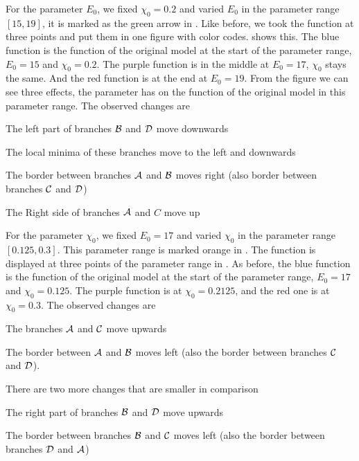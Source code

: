 For the parameter $E_0$, we fixed $\chi_0 = 0.2$ and varied $E_0$ in the parameter range $[15, 19]$, it is marked as the green arrow in .
Like before, we took the function at three points and put them in one figure with color codes.
 shows this.
The blue function is the function of the original model at the start of the parameter range, $E_0 = 15$ and $\chi_0 = 0.2$.
The purple function is in the middle at $E_0 = 17$, $\chi_0$ stays the same.
And the red function is at the end at $E_0 = 19$.
From the figure we can see three effects, the parameter has on the function of the original model in this parameter range.
The observed changes are
\begin{enumerate*}
    \item The left part of branches $\mathcal{B}$ and $\mathcal{D}$ move downwards
    \item The local minima of these branches move to the left and downwards
    \item The border between branches $\mathcal{A}$ and $\mathcal{B}$ moves right (also border between branches $\mathcal{C}$ and $\mathcal{D}$)
    \item The Right side of branches $\mathcal{A}$ and $C$ move up 
\end{enumerate*}

For the parameter $\chi_0$, we fixed $E_0 = 17$ and varied $\chi_0$ in the parameter range $[0.125, 0.3]$.
This parameter range is marked orange in .
The function is displayed at three points of the parameter range in .
As before, the blue function is the function of the original model at the start of the parameter range, $E_0 = 17$ and $\chi_0 = 0.125$.
The purple function is at $\chi_0 = 0.2125$, and the red one is at $\chi_0 = 0.3$.
The observed changes are
\begin{enumerate*}
    \item The branches $\mathcal{A}$ and $\mathcal{C}$ move upwards
    \item The border between $\mathcal{A}$ and $\mathcal{B}$ moves left (also the border between branches $\mathcal{C}$ and $\mathcal{D}$).
\end{enumerate*}
There are two more changes that are smaller in comparison
\begin{enumerate*}
    \item The right part of branches $\mathcal{B}$ and $\mathcal{D}$ move upwards
    \item The border between branches $\mathcal{B}$ and $\mathcal{C}$ moves left (also the border between branches $\mathcal{D}$ and $\mathcal{A}$)
\end{enumerate*}

